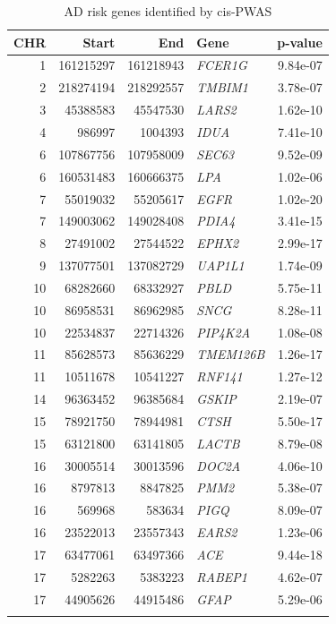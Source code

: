 \begin{longtable}{rrrlr}
\caption{AD risk genes identified by cis-PWAS} \\ 
  \toprule
CHR & Start & End & Gene & p-value \\ 
  \midrule
  1 & 161215297 & 161218943 & \textit{FCER1G} & 9.84e-07 \\ 
    2 & 218274194 & 218292557 & \textit{TMBIM1} & 3.78e-07 \\ 
    3 & 45388583 & 45547530 & \textit{LARS2} & 1.62e-10 \\ 
    4 & 986997 & 1004393 & \textit{IDUA} & 7.41e-10 \\ 
    6 & 107867756 & 107958009 & \textit{SEC63} & 9.52e-09 \\ 
    6 & 160531483 & 160666375 & \textit{LPA} & 1.02e-06 \\ 
    7 & 55019032 & 55205617 & \textit{EGFR} & 1.02e-20 \\ 
    7 & 149003062 & 149028408 & \textit{PDIA4} & 3.41e-15 \\ 
    8 & 27491002 & 27544522 & \textit{EPHX2} & 2.99e-17 \\ 
    9 & 137077501 & 137082729 & \textit{UAP1L1} & 1.74e-09 \\ 
   10 & 68282660 & 68332927 & \textit{PBLD} & 5.75e-11 \\ 
   10 & 86958531 & 86962985 & \textit{SNCG} & 8.28e-11 \\ 
   10 & 22534837 & 22714326 & \textit{PIP4K2A} & 1.08e-08 \\ 
   11 & 85628573 & 85636229 & \textit{TMEM126B} & 1.26e-17 \\ 
   11 & 10511678 & 10541227 & \textit{RNF141} & 1.27e-12 \\ 
   14 & 96363452 & 96385684 & \textit{GSKIP} & 2.19e-07 \\ 
   15 & 78921750 & 78944981 & \textit{CTSH} & 5.50e-17 \\ 
   15 & 63121800 & 63141805 & \textit{LACTB} & 8.79e-08 \\ 
   16 & 30005514 & 30013596 & \textit{DOC2A} & 4.06e-10 \\ 
   16 & 8797813 & 8847825 & \textit{PMM2} & 5.38e-07 \\ 
   16 & 569968 & 583634 & \textit{PIGQ} & 8.09e-07 \\ 
   16 & 23522013 & 23557343 & \textit{EARS2} & 1.23e-06 \\ 
   17 & 63477061 & 63497366 & \textit{ACE} & 9.44e-18 \\ 
   17 & 5282263 & 5383223 & \textit{RABEP1} & 4.62e-07 \\ 
   17 & 44905626 & 44915486 & \textit{GFAP} & 5.29e-06 \\ 
   \bottomrule
\label{tab:cis-PWAS_riskgenes}
\end{longtable}
\pagebreak

